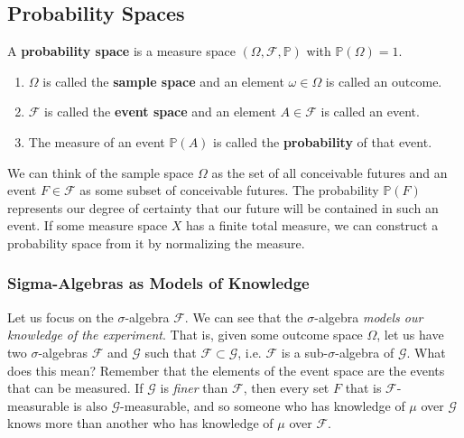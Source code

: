\subsection{Probability Spaces}

  \begin{definition}
    A \textbf{probability space} is a measure space $(\Omega, \mathcal{F}, \mathbb{P})$ with $\mathbb{P}(\Omega) = 1$. 
    \begin{enumerate}
      \item $\Omega$ is called the \textbf{sample space} and an element $\omega \in \Omega$ is called an outcome. 
      \item $\mathcal{F}$ is called the \textbf{event space} and an element $A \in \mathcal{F}$ is called an event. 
      \item The measure of an event $\mathbb{P}(A)$ is called the \textbf{probability} of that event. 
    \end{enumerate}
    We can think of the sample space $\Omega$ as the set of all conceivable futures and an event $F \in \mathcal{F}$ as some subset of conceivable futures. The probability $\mathbb{P}(F)$ represents our degree of certainty that our future will be contained in such an event. If some measure space $X$ has a finite total measure, we can construct a probability space from it by normalizing the measure. 
  \end{definition}

  \subsubsection{Sigma-Algebras as Models of Knowledge}

    Let us focus on the $\sigma$-algebra $\mathcal{F}$. We can see that the $\sigma$-algebra \textit{models our knowledge of the experiment}. That is, given some outcome space $\Omega$, let us have two $\sigma$-algebras $\mathcal{F}$ and $\mathcal{G}$ such that $\mathcal{F} \subset \mathcal{G}$, i.e. $\mathcal{F}$ is a sub-$\sigma$-algebra of $\mathcal{G}$. What does this mean? Remember that the elements of the event space are the events that can be measured. If $\mathcal{G}$ is \textit{finer} than $\mathcal{F}$, then every set $F$ that is $\mathcal{F}$-measurable is also $\mathcal{G}$-measurable, and so someone who has knowledge of $\mu$ over $\mathcal{G}$ knows more than another who has knowledge of $\mu$ over $\mathcal{F}$. 

